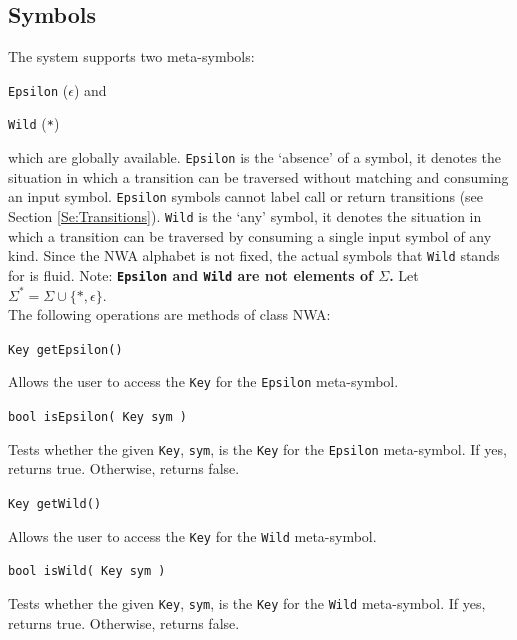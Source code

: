 \documentclass{llncs}
\begin{document}
\subsection{Symbols}
\label{Se:Symbols}

The system supports two meta-symbols: \begin{inparaenum} \item
  \texttt{Epsilon} (\texttt{$\epsilon$}) and \item \texttt{Wild}
  (\texttt{*}) \end{inparaenum} which are globally available.
\texttt{Epsilon} is the `absence' of a symbol, it denotes the situation in
which a transition can be traversed without matching and consuming an input
symbol.  \texttt{Epsilon} symbols cannot label call or return transitions
(see Section \ref{Se:Transitions}).  \texttt{Wild} is the `any' symbol, it
denotes the situation in which a transition can be traversed by consuming a
single input symbol of any kind.  Since the NWA alphabet is not fixed, the
actual symbols that \texttt{Wild} stands for is fluid.  Note:
\textbf{\texttt{Epsilon} and \texttt{Wild} are not elements of $\Sigma$.} Let
$\Sigma^* = \Sigma \cup \{*, \epsilon\}$.\\

\noindent The following operations are methods of class NWA:

\begin{description}

  \item\texttt{Key getEpsilon()} \nopagebreak

    Allows the user to access the \texttt{Key} for the \texttt{Epsilon}
    meta-symbol.

  \item\texttt{bool isEpsilon( Key sym )} \nopagebreak

    Tests whether the given \texttt{Key}, \texttt{sym}, is the \texttt{Key}
    for the \texttt{Epsilon} meta-symbol.  If yes, returns true.  Otherwise,
    returns false.

  \item\texttt{Key getWild()} \nopagebreak

    Allows the user to access the \texttt{Key} for the \texttt{Wild}
    meta-symbol.

  \item\texttt{bool isWild( Key sym )} \nopagebreak
 
    Tests whether the given \texttt{Key}, \texttt{sym}, is the \texttt{Key}
    for the \texttt{Wild} meta-symbol. If yes, returns true.  Otherwise,
    returns false. \\

\end{description}
\end{document}
